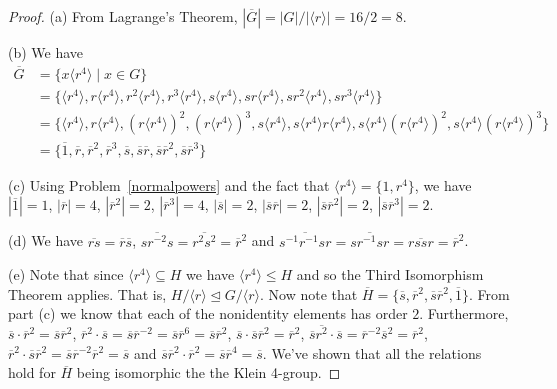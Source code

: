 \documentclass{article}
\newcommand{\normal}{\unlhd}
\begin{document}
\begin{proof}
(a) From Lagrange's Theorem, $|\overline{G}| = |G|/|\langle r \rangle| = 16/2 = 8$.

(b) We have
\begin{align*}
\overline{G}
&= \{x\langle r^4 \rangle \mid x \in G\} \\
&= \{\langle r^4 \rangle, r\langle r^4 \rangle, r^2\langle r^4 \rangle, r^3\langle r^4 \rangle, s\langle r^4 \rangle, sr\langle r^4 \rangle, sr^2\langle r^4 \rangle, sr^3\langle r^4 \rangle\} \\
&= \{\langle r^4 \rangle, r\langle r^4 \rangle, (r\langle r^4 \rangle)^2, (r\langle r^4 \rangle)^3, s\langle r^4 \rangle, s\langle r^4 \rangle r\langle r^4 \rangle, s\langle r^4 \rangle (r\langle r^4 \rangle)^2, s\langle r^4 \rangle (r\langle r^4 \rangle)^3\} \\
&= \{\overline{1}, \overline{r}, \overline{r}^2, \overline{r}^3, \overline{s}, \overline{s}\overline{r}, \overline{s}\overline{r}^2, \overline{s}\overline{r}^3\}
\end{align*}

(c) Using Problem~\ref{normalpowers} and the fact that $\langle r^4 \rangle = \{1, r^4\}$, we have $|\overline{1}| = 1$, $|\overline{r}| = 4$, $|\overline{r}^2| = 2$, $|\overline{r}^3| = 4$, $|\overline{s}| = 2$, $|\overline{s}\overline{r}| = 2$, $|\overline{s}\overline{r}^2| = 2$, $|\overline{s}\overline{r}^3| = 2$.

(d) We have $\overline{rs} = \overline{r}\overline{s}$, $\overline{sr^{-2}s} = \overline{r^2s^2} = \overline{r}^2$ and $\overline{s^{-1}r^{-1}sr} = \overline{sr^{-1}sr} = \overline{rssr} = \overline{r}^2$.

(e) Note that since $\langle r^4 \rangle \subseteq H$ we have $\langle r^4 \rangle \leq H$ and so the Third Isomorphism Theorem applies. That is, $H/\langle r \rangle \normal G/\langle r \rangle$. Now note that $\overline{H} = \{\overline{s}, \overline{r}^2, \overline{s}\overline{r}^2, \overline{1}\}$. From part (c) we know that each of the nonidentity elements has order $2$. Furthermore, $\overline{s} \cdot \overline{r}^2 = \overline{s}\overline{r}^2$, $\overline{r}^2 \cdot \overline{s} = \overline{s}\overline{r}^{-2} = \overline{s}\overline{r}^6 = \overline{s}\overline{r}^2$, $\overline{s} \cdot \overline{s}\overline{r}^2 = \overline{r}^2$, $\overline{s}\overline{r^2} \cdot \overline{s} = \overline{r}^{-2}\overline{s}^2 = \overline{r}^2$, $\overline{r}^2 \cdot \overline{s}\overline{r}^2 = \overline{s}\overline{r}^{-2}\overline{r}^2 = \overline{s}$ and $\overline{s}\overline{r}^2 \cdot \overline{r}^2 = \overline{s}\overline{r}^4 = \overline{s}$. We've shown that all the relations hold for $\overline{H}$ being isomorphic the the Klein 4-group.


\end{proof}
\end{document}
